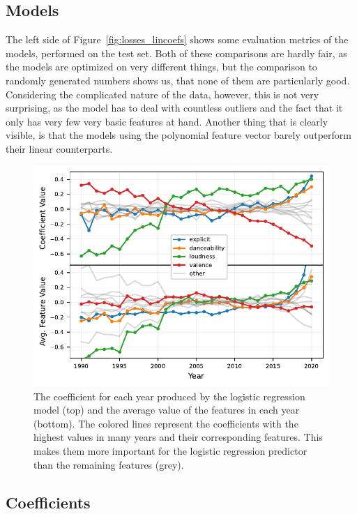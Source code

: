\documentclass{article}
\begin{document}
\subsection{Models}

The left side of Figure~\ref{fig:losses_lincoefs} shows some evaluation metrics of the models, performed on the test set. 
Both of these comparisons are hardly fair, as the models are optimized on very different things, but the comparison to randomly generated numbers shows us, that none of them are particularly good. Considering the complicated nature of the data, however, this is not very surprising, as the model has to deal with countless outliers and the fact that it only has very few very basic features at hand.
Another thing that is clearly visible, is that the models using the polynomial feature vector barely outperform their linear counterparts.

\begin{figure}[t]
  \centering
  \includegraphics{coefs_avg}
  \caption{The coefficient for each year produced by the logistic regression model (top) and the average value of the features in each year (bottom). The colored lines represent the coefficients with the highest values in many years and their corresponding features. This makes them more important for the logistic regression predictor than the remaining features (grey).} 
  \label{fig:coefs_avg}
\end{figure}
\subsection{Coefficients}
\end{document}
